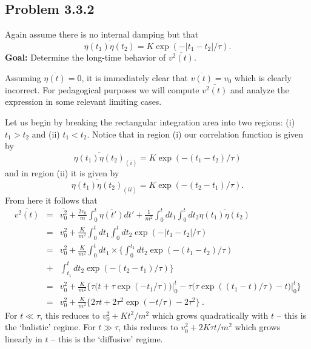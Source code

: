 \subsection{Problem 3.3.2}

Again assume there is no internal damping but that
\begin{equation}
\overline{\eta(t_1) \eta(t_2)} = K \exp(-|t_1-t_2|/\tau).
\end{equation}
\textbf{Goal:} Determine the long-time behavior of $\overline{v^2(t)}$.

Assuming $\overline{\eta(t)}=0$, it is immediately clear that $\overline{v(t)}=v_0$ which is clearly incorrect. For pedagogical purposes we will compute $\overline{v^2(t)}$ and analyze the expression in some relevant limiting cases.

Let us begin by breaking the rectangular integration area into two regions: (i) $t_1>t_2$ and (ii) $t_1 < t_2$. Notice that in region (i) our correlation function is given by 
\begin{equation}
\overline{\eta(t_1) \eta(t_2)}_{(i)} = K \exp(-(t_1-t_2)/\tau)
\end{equation}
and in region (ii) it is given by 
\begin{equation}
\overline{\eta(t_1) \eta(t_2)}_{(ii)} = K \exp(-(t_2-t_1)/\tau).
\end{equation}
From here it follows that
\begin{eqnarray}
\overline{v^2(t)}&=& \overline{v_0^2} + \frac{2 v_0 }{m} \int_{0}^{t} \overline{\eta(t')} dt' + \frac{1}{m^2} \int_{0}^{t} dt_1 \int_{0}^{t} dt_2 \overline{\eta(t_1) \eta(t_2)} \nonumber \\
&=& v_0^2 + \frac{K}{m^2} \int_{0}^{t} dt_1 \int_{0}^{t} dt_2 \exp(-|t_1-t_2|/\tau) \nonumber \\
&=& v_0^2 + \frac{K}{m^2} \int_{0}^{t} dt_1 \times \bigg\{ \int_{0}^{t_1} dt_2 \exp(-(t_1-t_2)/\tau) \nonumber \\ &+& \int_{t_1}^{t} dt_2 \exp(-(t_2-t_1)/\tau)\bigg\} \nonumber \\
&=& v_0^2 + \frac{K}{m^2} \bigg\{ \tau \bigg(t + \tau \exp(-t_1/\tau)\bigg) \bigg|_{0}^{t} - \tau \bigg(\tau \exp((t_1-t)/\tau)-t\bigg) \bigg|_{0}^{t} \bigg\} \nonumber \\
&=& \boxed{v_0^2 + \frac{K}{m^2} \bigg\{ 2 \tau t  + 2 \tau^2 \exp(-t/\tau) -2 \tau^2 \bigg\}}~.
\end{eqnarray}
For $t\ll\tau$, this reduces to $v_0^2+K t^2 / m^2$ which grows quadratically with $t$ -- this is the `balistic' regime. For $t\gg \tau$, this reduces to $v_0^2+2K \tau t / m^2$ which grows linearly in $t$ -- this is the `diffusive' regime.


